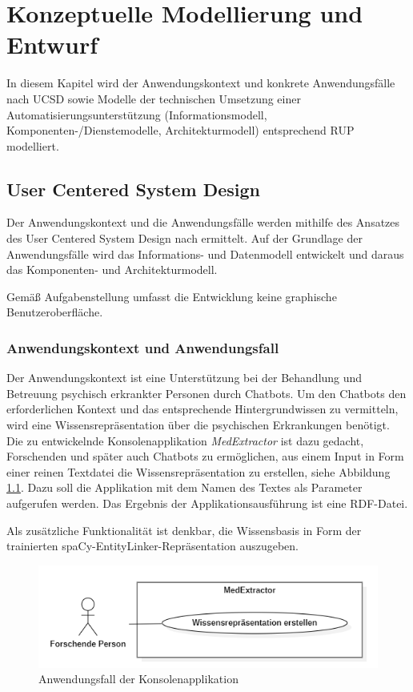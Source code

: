 \chapter{Konzeptuelle Modellierung und Entwurf}
\label{ch:modellierung}
In diesem Kapitel wird der Anwendungskontext und konkrete Anwendungsfälle nach UCSD sowie Modelle der technischen Umsetzung einer Automatisierungsunterstützung (Informationsmodell, Komponenten-/Dienstemodelle, Architekturmodell) entsprechend RUP modelliert.

\section{User Centered System Design }

Der Anwendungskontext und die Anwendungsfälle werden mithilfe des Ansatzes des User Centered System Design nach \cite{norman1986user} ermittelt. Auf der Grundlage der Anwendungsfälle wird das Informations- und Datenmodell entwickelt und daraus das Komponenten- und Architekturmodell.


Gemäß Aufgabenstellung umfasst die Entwicklung keine graphische Benutzeroberfläche.

\subsection{Anwendungskontext und Anwendungsfall}

Der Anwendungskontext ist eine Unterstützung bei der Behandlung und Betreuung psychisch erkrankter Personen durch Chatbots. Um den Chatbots den erforderlichen Kontext und das entsprechende Hintergrundwissen zu vermitteln, wird eine Wissensrepräsentation über die psychischen Erkrankungen benötigt. Die zu entwickelnde Konsolenapplikation \emph{MedExtractor} ist dazu gedacht, Forschenden und später auch Chatbots zu ermöglichen, aus einem Input in Form einer reinen Textdatei die Wissensrepräsentation zu erstellen, siehe Abbildung \ref{fig:anwendungsfaelle}. Dazu soll die Applikation mit dem Namen des Textes als Parameter aufgerufen werden. Das Ergebnis der Applikationsausführung ist eine RDF-Datei. 

Als zusätzliche Funktionalität ist denkbar, die Wissensbasis in Form der trainierten spaCy-EntityLinker-Repräsentation auszugeben.


\begin{figure}
    \centering
    \includegraphics[width=\textwidth]{pictures/UseCases.png}
    \caption{Anwendungsfall der Konsolenapplikation}
    \label{fig:anwendungsfaelle}
\end{figure}

